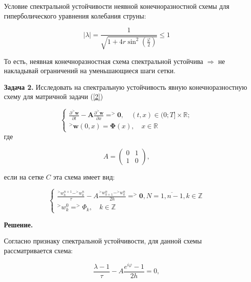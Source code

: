 \documentclass[14pt,a4paper]{scrartcl}
\begin{document}
Условие спектральной устойчивости неявной конечноразностной схемы для гиперболического уравнения колебания струны:

\begin{equation*}
	|\lambda|=\frac{1}{\sqrt{1+4 r \sin ^{2}\left(\frac{\varphi}{2}\right)}} \leq 1
\end{equation*}


То есть, неявная конечноразностная схема спектральной устойчива $\Rightarrow$ не накладывай ограничений на уменьшающиеся шаги сетки.


\pagebreak

\textbf{Задача 2.} Исследовать на спектральную устойчивость явную конечноразностную схему для матричной задачи (\ref{2})

\begin{equation}\label{2}
	\left\{\begin{array}{l}
	\frac{\partial^{>} \boldsymbol{w}}{\partial t}-\boldsymbol{A} \frac{\partial^{>} \boldsymbol{w}}{\partial x}=^{>} \mathbf{0}, \quad(t, x) \in(0 ; T] \times \mathbb{R} ; \\
	^>\boldsymbol{w}(0, x)=\mathbf{\Phi}(x), \quad x \in \mathbb{R}
	\end{array}\right.
\end{equation}
где 

\begin{equation*}
	A=\left(\begin{array}{ll}
	0 & 1 \\
	1 & 0
	\end{array}\right),
\end{equation*}

если на сетке $C$ эта схема имеет вид:

\begin{equation*}
	\left\{\begin{array}{l}
	\frac{^{>} w_{k}^{n+1}-^{>} w_{k}^{n}}{\tau}-A \frac{^{>} w_{k+1}^{n}-^{>} w_{k}^{n}}{2 h}=^{>} \mathbf{0}, N=\overline{1, n-1}, k \in \mathbb{Z} \\
	^{>} w_{k}^{0}=^{>} \Phi_{k}, \quad k \in \mathbb{Z}
	\end{array}\right.
\end{equation*}


\textbf{Решение.}

Согласно признаку спектральной устойчивости, для данной схемы рассматривается схема:

\begin{equation*}
	\frac{\lambda-1}{\tau}-A \frac{e^{i \varphi}-1}{2 h}=0,
\end{equation*}
\end{document}
